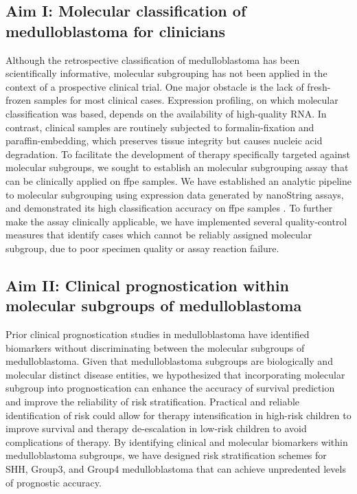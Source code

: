 \subsection*{Aim I: Molecular classification of medulloblastoma for clinicians}

Although the retrospective classification of medulloblastoma has been scientifically informative, molecular subgrouping has not been applied in the context of a prospective clinical trial. One major obstacle is the lack of fresh-frozen samples for most clinical cases. Expression profiling, on which molecular classification was based, depends on the availability of high-quality RNA. In contrast, clinical samples are routinely subjected to formalin-fixation and paraffin-embedding, which preserves tissue integrity but causes nucleic acid degradation. To facilitate the development of therapy specifically targeted against molecular subgroups, we sought to establish an molecular subgrouping assay that can be clinically applied on \gls{ffpe} samples. We have established an analytic pipeline to molecular subgrouping using expression data generated by nanoString assays, and demonstrated its high classification accuracy on \gls{ffpe} samples . To further make the assay clinically applicable, we have implemented several quality-control measures that identify cases which cannot be reliably assigned molecular subgroup, due to poor specimen quality or assay reaction failure.

\subsection*{Aim II: Clinical prognostication within molecular subgroups of medulloblastoma}

Prior clinical prognostication studies in medulloblastoma have identified biomarkers without discriminating between the molecular subgroups of medulloblastoma. Given that medulloblastoma subgroups are biologically and molecular distinct disease entities, we hypothesized that incorporating molecular subgroup into prognostication can enhance the accuracy of survival prediction and improve the reliability of risk stratification. Practical and reliable identification of risk could allow for therapy intensification in high-risk children to improve survival and therapy de-escalation in low-risk children to avoid complications of therapy. By identifying clinical and molecular biomarkers within medulloblastoma subgroups, we have designed risk stratification schemes for SHH, Group3, and Group4 medulloblastoma that can achieve unpredented levels of prognostic accuracy.

